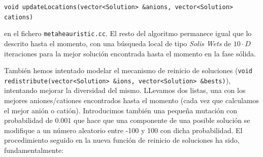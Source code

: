\documentclass[a4paper,11pt]{article}
\begin{document}
\begin{itemize}
 \texttt{void updateLocations(vector<Solution> \&anions, vector<Solution> cations)}
 
 en el fichero \texttt{metaheauristic.cc}. El resto del algoritmo permanece igual que lo descrito hasta el momento, con una búsqueda
 local de tipo \textit{Solis Wets} de $10\cdot D$ iteraciones para la mejor solución encontrada hasta el momento en la fase sólida.
 
 También hemos intentado modelar el mecanismo de reinicio de soluciones (\texttt{void redistribute(vector<Solution> \&ions, vector<Solution> \&bests)}),
 intentando mejorar la diversidad del mismo. LLevamos dos listas, una con los mejores aniones/cationes encontrados hasta el momento
 (cada vez que calculamos el mejor anión o catión). Introducimos también una pequeña mutación con probabilidad de $0.001$
 que hace que una componente de una posible solución se modifique a un número aleatorio entre -100 y 100 con dicha probabilidad.
 El procedimiento seguido en la nueva función de reinicio de soluciones ha sido, fundamentalmente:
 
  \small{\texttt{}}
  \normalsize 
 

\end{itemize}
\end{document}
